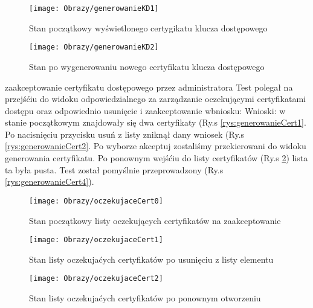 \begin{enumerate*}
	
	\begin{figure}[ht!]
		
		\begin{minipage}{0.4\textwidth}
			\texttt{[image: Obrazy/generowanieKD1]}
			\caption{Stan początkowy wyświetlonego certygikatu klucza dostępowego }
			\label{rys:generowanieKD1}
		\end{minipage}
		\begin{minipage}{0.4\textwidth}
			\texttt{[image: Obrazy/generowanieKD2]}
			\caption{Stan po wygenerowaniu nowego certyfikatu klucza dostępowego}
			\label{rys:generowanieKD2}
		\end{minipage}
		
	
	\end{figure}
	
	
	\item  zaakceptowanie certyfikatu dostępowego przez administratora
	Test polegał na przejśćiu do widoku odpowiedzialnego za zarządzanie oczekującymi certyfikatami dostępu oraz odpowiednio usunięcie i zaakceptowanie wbniosku:
	Wnioski: w stanie początkowym znajdowały się dwa certyfikaty (Ry.s \ref{rys:generowanieCert1}. Po nacisnięciu przycisku usuń z listy zniknął dany wniosek (Ry.s \ref{rys:generowanieCert2}. Po wyborze akceptuj zostaliśmy przekierowani do widoku generowania certyfikatu. Po ponownym wejśćiu do listy certyfikatów (Ry.s \ref{rys:generowanieCert3}) lista ta była pusta. Test został pomyślnie przeprowadzony (Ry.s \ref{rys:generowanieCert4}). 
	
		\begin{figure}[ht!]
		
		\begin{minipage}{0.2\textwidth}
			\texttt{[image: Obrazy/oczekujaceCert0]}
			\caption{Stan początkowy listy oczekujących certyfikatów na zaakceptowanie }
			\label{rys:generowanieCert1}
		\end{minipage}
		\begin{minipage}{0.2\textwidth}
			\texttt{[image: Obrazy/oczekujaceCert1]}
			\caption{Stan listy oczekujaćych certyfikatów po usunięciu z listy elementu}
			\label{rys:generowanieCert2}
		\end{minipage}
		
		\begin{minipage}{0.2\textwidth}
			\texttt{[image: Obrazy/oczekujaceCert2]}
			\caption{Stan listy oczekujaćych certyfikatów po ponownym otworzeniu}
			\label{rys:generowanieCert3}
		\end{minipage}
	

\end{figure}
\end{enumerate*}
